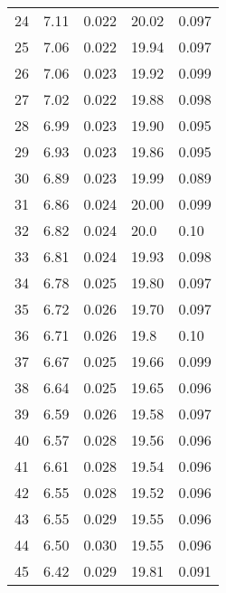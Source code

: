 \begin{table}
\begin{tabular}{c|ll|ll}
24 & 7.11 & 0.022 & 20.02 & 0.097 \\
25 & 7.06 & 0.022 & 19.94 & 0.097 \\
26 & 7.06 & 0.023 & 19.92 & 0.099 \\
27 & 7.02 & 0.022 & 19.88 & 0.098 \\
28 & 6.99 & 0.023 & 19.90 & 0.095 \\
29 & 6.93 & 0.023 & 19.86 & 0.095 \\
30 & 6.89 & 0.023 & 19.99 & 0.089 \\
31 & 6.86 & 0.024 & 20.00 & 0.099 \\
32 & 6.82 & 0.024 & 20.0 & 0.10 \\
33 & 6.81 & 0.024 & 19.93 & 0.098 \\
34 & 6.78 & 0.025 & 19.80 & 0.097 \\
35 & 6.72 & 0.026 & 19.70 & 0.097 \\
36 & 6.71 & 0.026 & 19.8 & 0.10 \\
37 & 6.67 & 0.025 & 19.66 & 0.099 \\
38 & 6.64 & 0.025 & 19.65 & 0.096 \\
39 & 6.59 & 0.026 & 19.58 & 0.097 \\
40 & 6.57 & 0.028 & 19.56 & 0.096 \\
41 & 6.61 & 0.028 & 19.54 & 0.096 \\
42 & 6.55 & 0.028 & 19.52 & 0.096 \\
43 & 6.55 & 0.029 & 19.55 & 0.096 \\
44 & 6.50 & 0.030 & 19.55 & 0.096 \\
45 & 6.42 & 0.029 & 19.81 & 0.091 \\
               \hline
        \end{tabular}
    \end{table}
    \clearpage


